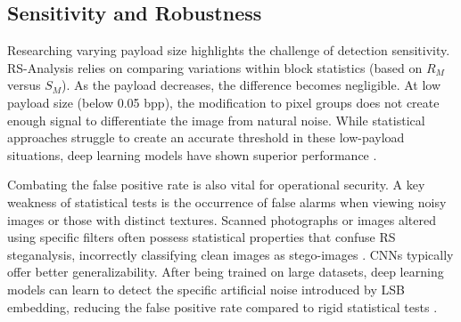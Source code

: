 \subsection{Sensitivity and Robustness}
Researching varying payload size highlights the challenge of detection sensitivity. 
RS-Analysis relies on comparing variations within block statistics (based on $R_M$ versus $S_M$). 
As the payload decreases, the difference becomes negligible. At low payload size (below 0.05 bpp), the modification to pixel groups does not create enough signal to differentiate the image from natural noise. 
While statistical approaches struggle to create an accurate threshold in these low-payload situations, deep learning models have shown superior performance \cite{Apau2024}.

Combating the false positive rate is also vital for operational security. 
A key weakness of statistical tests is the occurrence of false alarms when viewing noisy images or those with distinct textures. 
Scanned photographs or images altered using specific filters often possess statistical properties that confuse RS steganalysis, incorrectly classifying clean images as stego-images \cite{Fridrich2002}. 
CNNs typically offer better generalizability. After being trained on large datasets, deep learning models can learn to detect the specific artificial noise introduced by LSB embedding, reducing the false positive rate compared to rigid statistical tests \cite{Qian2015, Apau2024}. 
